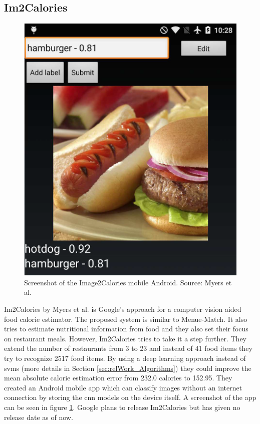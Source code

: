 \subsection{Im2Calories}
\begin{figure}[htbp]
	\centering
	\includegraphics[scale=0.25]{data/images/relWork/im2calories_screenshot}
	\caption{Screenshot of the Image2Calories mobile Android. Source: Myers et al. \cite{Meyers2015}}
	\label{fig:im2caloriesScreenshot}
\end{figure}
Im2Calories by Myers et al. \cite{Meyers2015} is Google's approach for a computer vision aided food calorie estimator. The proposed system is similar to Menue-Match. It also tries to estimate nutritional information from food and they also set their focus on restaurant meals. However, Im2Calories tries to take it a step further. They extend the number of restaurants from 3 to 23 and instead of 41 food items they try to recognize 2517 food items. By using a deep learning approach instead of \glspl{svm} {(more details in Section \ref{sec:relWork_Algorithms})} they could improve the mean absolute calorie estimation error from 232.0 calories to 152.95. They created an Android mobile app which can classify images without an internet connection by storing the \gls{cnn} models on the device itself. A screenshot of the app can be seen in figure \ref{fig:im2caloriesScreenshot}. Google plans to release Im2Calories but has given no release date as of now. 